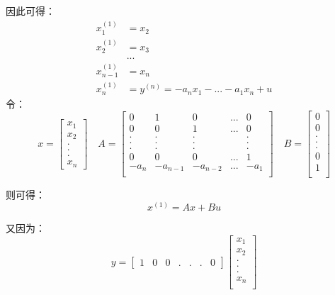 \documentclass{article}
\numberwithin{equation}{section}
\numberwithin{figure}{section}
\begin{document}
因此可得：
\begin{equation}
    \begin{split}
        x^{(1)}_1&=x_2\\
        x^{(1)}_2&=x_3\\
        &...\\
        x^{(1)}_{n-1}&=x_n\\
        x^{(1)}_{n}&=y^{(n)}=-a_nx_1-...-a_1x_n+u
    \end{split}
\end{equation}
令：
\begin{equation}
    x=
    \begin{bmatrix}
        x_1\\
        x_2\\
        .\\
        .\\
        .\\
        x_n
    \end{bmatrix}
    \quad
    A=
    \begin{bmatrix}
        0&1&0&...&0\\
        0&0&1&...&0\\
        .&.&.& &.\\
        .&.&.& &.\\
        .&.&.& &.\\
        0&0&0&...&1\\
        -a_n&-a_{n-1}&-a_{n-2}&...&-a_1\\
    \end{bmatrix}
    \quad
    B=
    \begin{bmatrix}
        0\\
        0\\
        .\\
        .\\
        .\\
        0\\
        1\\
    \end{bmatrix}
\end{equation}

则可得：
\begin{equation}
    x^{(1)}=Ax+Bu
\end{equation}

又因为：
\begin{equation}
    y=
    \begin{bmatrix}
        1&0&0&.&.&.&0
    \end{bmatrix}
    \begin{bmatrix}
        x_1\\
        x_2\\
        .\\
        .\\
        .\\
        x_n\\
    \end{bmatrix}
\end{equation}
\end{document}

